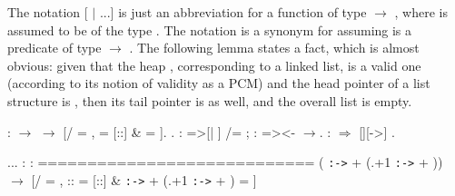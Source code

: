 The notation [  \ensuremath{|} ...] is just an abbreviation for a function
of type  \ensuremath{\rightarrow} , where  is assumed to be of the type . The
notation    is a synonym for   assuming  is a predicate
of type  \ensuremath{\rightarrow} .
The following lemma  states a fact, which is almost
obvious: given that the heap , corresponding to a linked list, is a
valid one (according to its notion of validity as a PCM) and the head
pointer of a list structure is , then its tail pointer is 
as well, and the overall list is empty.
\begin{coqdoccode}
\coqdocemptyline
\coqdocnoindent
{}     : \coqdoceol
\coqdocindent{4.50em}
  \ensuremath{\rightarrow}       \ensuremath{\rightarrow} \coqdoceol
\coqdocindent{4.50em}
[/  = ,  = [::] \&  = ].\coqdoceol
\coqdocnoindent
{}.\coqdoceol
\coqdocnoindent
{}: =>[| ]  /= ;   : =><- \ensuremath{\rightarrow}.\coqdoceol
\coqdocnoindent
{}:  \ensuremath{\Rightarrow} [][->] \coqdocvar{\_}.\coqdoceol
\end{coqdoccode}
\coqdoceol
\coqdocemptyline
\coqdocindent{1.00em}
...\coqdoceol
\coqdocindent{1.00em}
 : \coqdoceol
\coqdocindent{1.00em}
 : \coqdoceol
\coqdocindent{1.00em}
============================\coqdoceol
\coqdocindent{1.50em}
 ( \texttt{:->}  + (.+1 \texttt{:->}  + )) \ensuremath{\rightarrow}\coqdoceol
\coqdocindent{1.50em}
[/  = ,  ::  = [::] \&  \texttt{:->}  + (.+1 \texttt{:->}  + ) = ]

